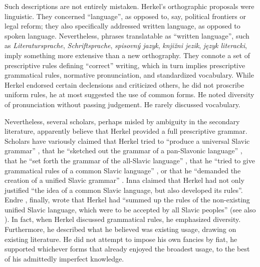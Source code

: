 Such descriptions are not entirely mistaken. Herkel’s orthographic proposals were linguistic. They concerned “language”, as opposed to, say, political frontiers or legal reform; they also specifically addressed written language, as opposed to spoken language. Nevertheless, phrases translatable as “written language”, such as \textit{Literatursprache}, \textit{Schriftsprache}, \textit{spisovný jazyk}, \textit{knjižni jezik}, \textit{język literacki}, imply something more extensive than a new orthography. They connote a set of prescriptive rules defining “correct” writing, which in turn implies prescriptive grammatical rules, normative pronunciation, and standardized vocabulary. While Herkel endorsed certain declensions and criticized others, he did not proscribe uniform rules, he at most suggested the use of common forms. He noted diversity of pronunciation without passing judgement. He rarely discussed vocabulary.

Nevertheless, several scholars, perhaps misled by ambiguity in the secondary literature, apparently believe that Herkel provided a full prescriptive grammar. Scholars have variously claimed that Herkel tried to “produce a universal Slavic grammar” \citep[108]{haraksim_slovak_2011}, that he “sketched out the grammar of a pan-Slavonic language” \citep[197]{auty_internal_1967}, that he “set forth the grammar of the all-Slavic language” \citep[50]{smirnov_istoricheskij_2000}, that he “tried to give grammatical rules of a common Slavic language” \citep[27]{churkina_vopros_1998}, or that he “demanded the creation of a unified Slavic grammar” \citep[177]{kun_classification_1982}. Inna \citet[118]{leshchilovskaja_idei_1977} claimed that Herkel had not only justified “the idea of a common Slavic language, but also developed its rules”. Endre \citet[76]{arato_slavic_1976}, finally, wrote that Herkel had “summed up the rules of the non-existing unified Slavic language, which were to be accepted by all Slavic peoples” (see also \cite[260]{arato_plan_1971}). In fact, when Herkel discussed grammatical rules, he emphasized diversity. Furthermore, he described what he believed was existing usage, drawing on existing literature. He did not attempt to impose his own fancies by fiat, he supported whichever forms that already enjoyed the broadest usage, to the best of his admittedly imperfect knowledge.

